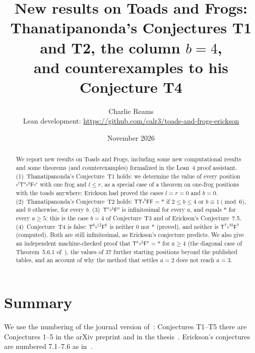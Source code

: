 \documentclass[11pt,a4paper]{article}
\title{New results on Toads and Frogs:\\
Thanatipanonda's Conjectures T1 and T2, the column $b=4$,\\
and counterexamples to his Conjecture T4}
\author{Charlie Reams\\[4pt]
\small Lean development: \url{https://github.com/calr3/toads-and-frogs-erickson}}
\date{November 2026}
\newcommand{\Tt}{\mathsf{T}}
\newcommand{\Ff}{\mathsf{F}}
\newcommand{\E}{\square}
\theoremstyle{plain}
\theoremstyle{remark}
\begin{document}
\maketitle

\begin{abstract}
We report new results on Toads and Frogs, including some new computational results and some theorems (and counterexamples) formalized in the Lean~4 proof
assistant.
(1)~Thanatipanonda's Conjecture~T1 holds: we determine the value of every position
$\E^l\Tt^a\E^b\Ff\E^r$ with one frog and $l\le r$, as a special case of a theorem on one-frog
positions with the toads anywhere; Erickson had proved the cases $l=r=0$ and $b=0$.
(2)~Thanatipanonda's Conjecture~T2 holds:
$\Tt\Tt\E^b\Ff\Ff=\ast$ if $2\le b\le 4$ or $b\equiv 1\pmod 6$, and $0$ otherwise, for every $b$.
(3)~$\Tt^a\E^4\Ff^a$ is infinitesimal for every $a$, and equals $\ast$ for every $a\ge5$; this is
the case $b=4$ of Conjecture~T3 and of Erickson's Conjecture~7.5. (4)~Conjecture~T4 is false:
$\Tt^6\E^{12}\Ff^6$ is neither $0$ nor $\ast$ (proved), and neither is $\Tt^7\E^{10}\Ff^7$
(computed). Both are still infinitesimal, as Erickson's conjecture predicts. We also give an
independent machine-checked proof that $\Tt^a\E^3\Ff^a=\ast$ for $a\ge4$ (the diagonal case of
Theorem~5.6.1 of~\cite{Th08}), the values of 37 further starting positions beyond the published
tables, and an account of why the method that settles $a=2$ does not reach $a=3$.
\end{abstract}

\section{Summary}

We use the numbering of the journal version of~\cite{T11}: Conjectures T1--T5 there are
Conjectures 1--5 in the arXiv preprint and in the thesis~\cite{Th08}. Erickson's conjectures are
numbered 7.1--7.6 as in~\cite{E96}.
\end{document}
